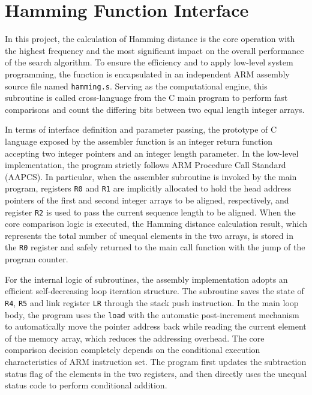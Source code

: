 \section{Hamming Function Interface}
\label{sec:hamming}

In this project, the calculation of Hamming distance is the core operation with the highest frequency and the most significant impact on the overall performance of the search algorithm. To ensure the efficiency and to apply low-level system programming, the function is encapsulated in an independent ARM assembly source file named \texttt{hamming.s}. Serving as the computational engine, this subroutine is called cross-language from the C main program to perform fast comparisons and count the differing bits between two equal length integer arrays.

In terms of interface definition and parameter passing, the prototype of C language exposed by the assembler function is an integer return function accepting two integer pointers and an integer length parameter. In the low-level implementation, the program strictly follows ARM Procedure Call Standard (AAPCS). In particular, when the assembler subroutine is invoked by the main program, registers \texttt{R0} and \texttt{R1} are implicitly allocated to hold the head address pointers of the first and second integer arrays to be aligned, respectively, and register \texttt{R2} is used to pass the current sequence length to be aligned. When the core comparison logic is executed, the Hamming distance calculation result, which represents the total number of unequal elements in the two arrays, is stored in the \texttt{R0} register and safely returned to the main call function with the jump of the program counter.

For the internal logic of subroutines, the assembly implementation adopts an efficient self-decreasing loop iteration structure. The subroutine saves the state of \texttt{R4}, \texttt{R5} and link register \texttt{LR} through the stack push instruction. In the main loop body, the program uses the \texttt{load} with the automatic post-increment mechanism to automatically move the pointer address back while reading the current element of the memory array, which reduces the addressing overhead. The core comparison decision completely depends on the conditional execution characteristics of ARM instruction set. The program first updates the subtraction status flag of the elements in the two registers, and then directly uses the unequal status code to perform conditional addition.

